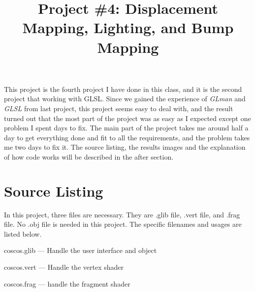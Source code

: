 \documentclass[letterpaper,14pt,titlepage,fleqn]{article}
\author{\name}
\title{Project \#4: Displacement Mapping, Lighting, and Bump Mapping}
\begin{document}
\maketitle

This project is the fourth project I have done in this class, and it is the second project that working with GLSL. Since we gained the experience of \textit{GLman} and \textit{GLSL} from last project, this project seems easy to deal with, and the result turned out that the most part of the project was as easy as I expected except one problem I spent days to fix. The main part of the project takes me around half a day to get everything done and fit to all the requirements, and the problem takes me two days to fix it. The source listing, the results images and the explanation of how code works will be described in the after section. 

\section{Source Listing}
In this project, three files are necessary. They are .glib file, .vert file, and .frag file. No .obj file is needed in this project. The specific filenames and usages are listed below.

coscos.glib --- Handle the user interface and object

coscos.vert --- Handle the vertex shader

coscos.frag --- handle the fragment shader
\end{document}
